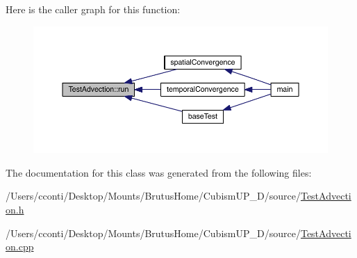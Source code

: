 Here is the caller graph for this function\+:
\nopagebreak
\begin{figure}[H]
\begin{center}
\leavevmode
\includegraphics[width=350pt]{d1/d76/class_test_advection_a06ea2c54a664b65b02259ba2c0c4ff38_icgraph}
\end{center}
\end{figure}




The documentation for this class was generated from the following files\+:\begin{DoxyCompactItemize}
\item 
/\+Users/cconti/\+Desktop/\+Mounts/\+Brutus\+Home/\+Cubism\+U\+P\+\_\+D/source/\hyperlink{_test_advection_8h}{Test\+Advection.\+h}\item 
/\+Users/cconti/\+Desktop/\+Mounts/\+Brutus\+Home/\+Cubism\+U\+P\+\_\+D/source/\hyperlink{_test_advection_8cpp}{Test\+Advection.\+cpp}\end{DoxyCompactItemize}
